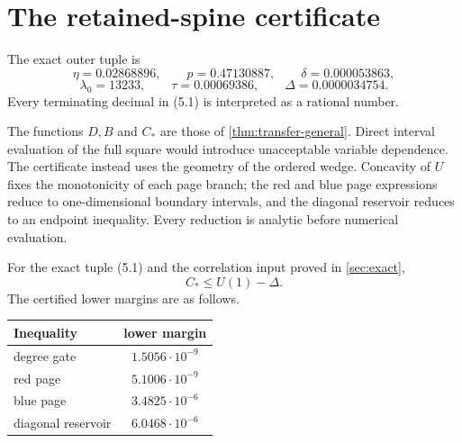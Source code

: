 \section{The retained-spine certificate}\label{sec:transfer}

The exact outer tuple is
\[
 \eta=0.02868896,\qquad p=0.47130887,\qquad
 \delta=0.000053863,
\]
\[
 \lambda_0=13233,\qquad \tau=0.00069386,\qquad
 \Delta=0.0000034754.
 \tag{5.1}
\]
Every terminating decimal in (5.1) is interpreted as a rational number.

The functions \(D,B\) and \(C_*\) are those of
\cref{thm:transfer-general}.  Direct interval evaluation of the full square
would introduce unacceptable variable dependence.  The certificate instead
uses the geometry of the ordered wedge.  Concavity of \(U\) fixes the
monotonicity of each page branch; the red and blue page expressions reduce to
one-dimensional boundary intervals, and the diagonal reservoir reduces to
an endpoint inequality.  Every reduction is analytic before numerical
evaluation.

\begin{proposition}\label{prop:outer}
For the exact tuple (5.1) and the correlation input proved in
\cref{sec:exact},
\[
 C_*\le U(1)-\Delta.
 \tag{5.2}
\]
The certified lower margins are as follows.
\begin{center}
\begin{tabular}{lc}
\toprule
Inequality & lower margin\\
\midrule
degree gate & \(1.5056\cdot10^{-9}\)\\
red page & \(5.1006\cdot10^{-9}\)\\
blue page & \(3.4825\cdot10^{-6}\)\\
diagonal reservoir & \(6.0468\cdot10^{-6}\)\\
\bottomrule
\end{tabular}
\end{center}
\end{proposition}

